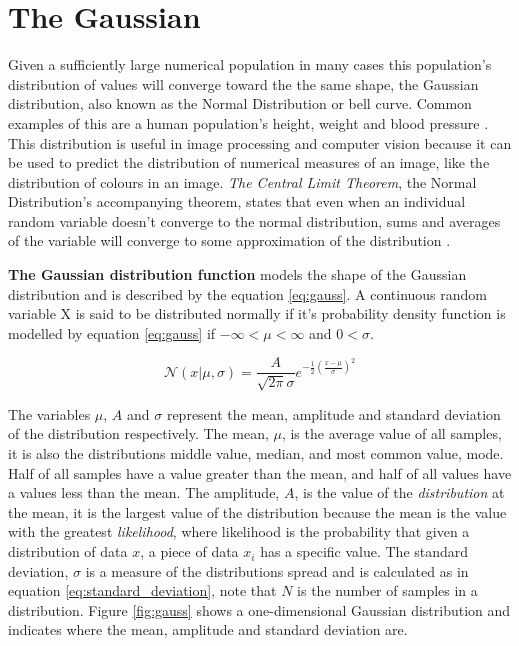 \section{The Gaussian}
\label{section:gaussian}

Given a sufficiently large numerical population in many cases this population's distribution of values will converge toward the the same shape, the Gaussian distribution, also known as the Normal Distribution or bell curve. Common examples of this are a human population's height, weight and blood pressure \cite{modern_statistics}. This distribution is useful in image processing and computer vision because it can be used to predict the distribution of numerical measures of an image, like the distribution of colours in an image. \emph{The Central Limit Theorem}, the Normal Distribution's accompanying theorem, states that even when an individual random variable doesn't converge to the normal distribution, sums and averages of the variable will converge to some approximation of the distribution \cite{modern_statistics}. 

\textbf{The Gaussian distribution function} models the shape of the Gaussian distribution and is described by the equation \ref{eq:gauss}. A continuous random variable X is said to be distributed normally if it's probability density function is modelled by equation \ref{eq:gauss} if $-\infty < \mu < \infty$ and $0 < \sigma$.


\begin{equation}
  \mathcal{N}(x|\mu,\sigma) = \frac{A}{\sqrt{2\pi}\sigma}e^{-\frac{1}{2}(\frac{x-\mu}{\sigma})^2}
\label{eq:gauss}
\end{equation}

The variables $\mu$, $A$ and $\sigma$ represent the mean, amplitude and standard deviation of the distribution respectively. The mean, $\mu$, is the average value of all samples, it is also the distributions middle value, median, and most common value, mode. Half of all samples have a value greater than the mean, and half of all values have a values less than the mean. The amplitude, $A$, is the value of the \emph{distribution} at the mean, it is the largest value of the distribution because the mean is the value with the greatest \emph{likelihood}, where likelihood is the probability that given a distribution of data $x$, a piece of data $x_i$ has a specific value. The standard deviation, $\sigma$ is a measure of the distributions spread and is calculated as in equation \ref{eq:standard_deviation}, note that $N$ is the number of samples in a distribution. Figure \ref{fig:gauss} shows a one-dimensional Gaussian distribution and indicates where the mean, amplitude and standard deviation are.

